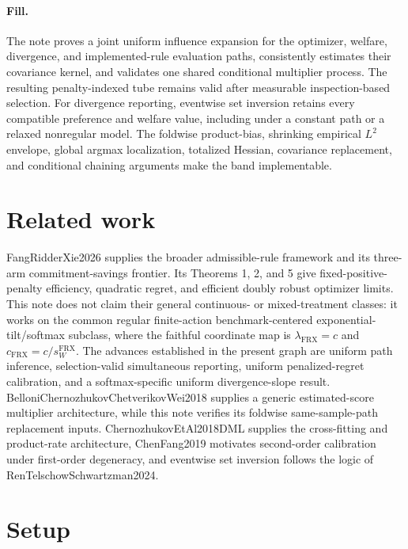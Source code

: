\documentclass{article}
\begin{document}
\paragraph{Fill.} The note proves a joint uniform influence expansion for the optimizer, welfare, divergence, and implemented-rule evaluation paths, consistently estimates their covariance kernel, and validates one shared conditional multiplier process. The resulting penalty-indexed tube remains valid after measurable inspection-based selection. For divergence reporting, eventwise set inversion retains every compatible preference and welfare value, including under a constant path or a relaxed nonregular model. The foldwise product-bias, shrinking empirical \(L^2\) envelope, global argmax localization, totalized Hessian, covariance replacement, and conditional chaining arguments make the band implementable.

\section{Related work}

FangRidderXie2026 supplies the broader admissible-rule framework and its three-arm commitment-savings frontier. Its Theorems 1, 2, and 5 give fixed-positive-penalty efficiency, quadratic regret, and efficient doubly robust optimizer limits. This note does not claim their general continuous- or mixed-treatment classes: it works on the common regular finite-action benchmark-centered exponential-tilt/softmax subclass, where the faithful coordinate map is \(\lambda_{\mathrm{FRX}}=c\) and \(c_{\mathrm{FRX}}=c/s_W^{\mathrm{FRX}}\). The advances established in the present graph are uniform path inference, selection-valid simultaneous reporting, uniform penalized-regret calibration, and a softmax-specific uniform divergence-slope result. BelloniChernozhukovChetverikovWei2018 supplies a generic estimated-score multiplier architecture, while this note verifies its foldwise same-sample-path replacement inputs. ChernozhukovEtAl2018DML supplies the cross-fitting and product-rate architecture, ChenFang2019 motivates second-order calibration under first-order degeneracy, and eventwise set inversion follows the logic of RenTelschowSchwartzman2024.

\section{Setup}
\end{document}
